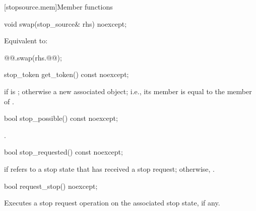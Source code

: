 [stopsource.mem]{Member functions}

%
\begin{itemdecl}
void swap(stop_source& rhs) noexcept;
\end{itemdecl}

\begin{itemdescr}
\pnum
\effects
Equivalent to:
\begin{codeblock}
@@.swap(rhs.@@);
\end{codeblock}
\end{itemdescr}

%
\begin{itemdecl}
stop_token get_token() const noexcept;
\end{itemdecl}

\begin{itemdescr}
\pnum
\returns
{} if  is ;
otherwise a new associated  object;
i.e., its  member is equal to
the  member of .
\end{itemdescr}

%
\begin{itemdecl}
bool stop_possible() const noexcept;
\end{itemdecl}

\begin{itemdescr}
\pnum
\returns
{}.
\end{itemdescr}

%
\begin{itemdecl}
bool stop_requested() const noexcept;
\end{itemdecl}

\begin{itemdescr}
\pnum
\returns
{} if  refers to a stop state
that has received a stop request;
otherwise, .
\end{itemdescr}

%
\begin{itemdecl}
bool request_stop() noexcept;
\end{itemdecl}

\begin{itemdescr}
\pnum
\effects
Executes a stop request operation on
the associated stop state, if any.
\end{itemdescr}

